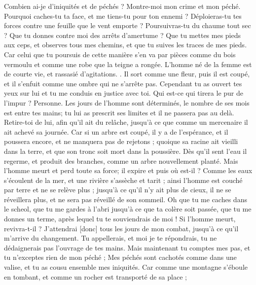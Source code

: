 \begin{multicols}{2}
Combien ai-je d'iniquités et de péchés ? Montre-moi mon crime et mon péché. 
Pourquoi caches-tu ta face, et me tiens-tu pour ton ennemi ?
Déploieras-tu tes forces contre une feuille que le vent emporte ? Poursuivras-tu du chaume tout sec  ?
Que tu donnes contre moi des arrêts d'amertume ?
Que tu mettes mes pieds aux ceps, et observes tous mes chemins, et que tu suives les traces de mes pieds.
Car celui que tu poursuis de cette manière s'en va par pièces comme du bois vermoulu et comme une robe que la teigne a rongée. 
\VerseOne{}L'homme né de la femme est de courte vie, et rassasié d'agitations. .
Il sort comme une fleur, puis il est coupé, et il s'enfuit comme une ombre qui ne s'arrête pas.
Cependant tu as ouvert tes yeux sur lui et tu me conduis en justice avec toi.
Qui est-ce qui tirera le pur de l'impur ? Personne.
Les jours de l'homme sont déterminés, le nombre de ses mois est entre tes mains; tu lui as prescrit ses limites et il ne passera pas au delà.
Retire-toi de lui, afin qu'il ait du relâche, jusqu'à ce que comme un mercenaire il ait achevé sa journée.
Car si un arbre est coupé, il y a de l'espérance, et il poussera encore, et ne manquera pas de rejetons ; 
quoique sa racine ait vieilli dans la terre, et que son tronc soit mort dans la poussière.
Dès qu'il sent l'eau il regerme, et produit des branches, comme un arbre nouvellement planté. 
Mais l'homme meurt et perd toute sa force; il expire et puis où est-il ?
Comme les eaux s'écoulent de la mer, et une rivière s'assèche et tarit ;
 ainsi l'homme est couché par terre et ne se relève plus ; jusqu'à ce qu'il n'y ait plus de cieux, il ne se réveillera plus, et ne sera pas réveillé de son sommeil. 
Oh que tu me caches dans le scheol, que tu me gardes à l'abri jusqu'à ce que ta colère soit passée, que tu me donnes un terme, après lequel tu te souviendrais de moi !
Si l'homme meurt, revivra-t-il ? J'attendrai [donc] tous les jours de mon combat, jusqu'à ce qu'il m'arrive du changement.
 Tu appellerais, et moi je te répondrais, tu ne dédaignerais pas l'ouvrage de tes mains.
Mais maintenant tu comptes mes pas, et tu n'exceptes rien de mon péché ;
Mes péchés sont cachotés comme dans une valise, et tu as cousu ensemble mes iniquités.
Car comme une montagne s'éboule en tombant, et comme un rocher est transporté de sa place ; 

\end{multicols}
